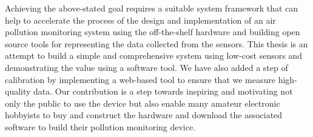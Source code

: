 \par

Achieving the above-stated goal requires a suitable system framework that can help to accelerate the process of the design and implementation of an air pollution monitoring system using the off-the-shelf hardware and building open source tools for representing the data collected from the sensors. This thesis is an attempt to build a simple and comprehensive system using low-cost sensors and demonstrating the value using a software tool. We have also added a step of calibration by implementing a web-based tool to ensure that we measure high-quality data. Our contribution is a step towards inspiring and motivating not only the public to use the device but also enable many amateur electronic hobbyists to buy and construct the hardware and download the associated software to build their pollution monitoring device.

